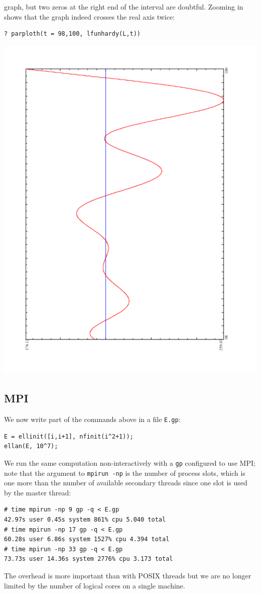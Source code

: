 \documentclass{deliverablereport}
\begin{document}
graph, but two zeros at the right end of the interval are doubtful. Zooming
in shows that the graph indeed crosses the real axis twice:
\begin{verbatim}
? parploth(t = 98,100, lfunhardy(L,t))
\end{verbatim}
\begin{center}
\includegraphics[scale=0.45,angle=-90]{L2.pdf}
\end{center}

\subsection{MPI}

We now write part of the commands above in a file \texttt{E.gp}:
\begin{verbatim}
E = ellinit([i,i+1], nfinit(i^2+1));
ellan(E, 10^7);
\end{verbatim}
We run the same computation non-interactively with a \texttt{gp} configured
to use MPI; note that the argument to \texttt{mpirun -np} is the number of
process slots, which is one more than the number of available secondary
threads since one slot is used by the master thread:
\begin{verbatim}
# time mpirun -np 9 gp -q < E.gp
42.97s user 0.45s system 861% cpu 5.040 total
# time mpirun -np 17 gp -q < E.gp
60.28s user 6.86s system 1527% cpu 4.394 total
# time mpirun -np 33 gp -q < E.gp
73.73s user 14.36s system 2776% cpu 3.173 total
\end{verbatim}
The overhead is more important than with POSIX
threads but we are no longer limited by the number of logical cores on a
single machine.
\end{document}
